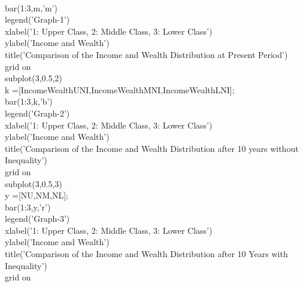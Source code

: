 \documentclass[12pt,a4paper]{article}
\begin{document}
\\bar(1:3,m,'m')
\\legend('Graph-1')
\\xlabel('1: Upper Class, 2: Middle Class, 3: Lower Class')
\\ylabel('Income and Wealth')
\\title('Comparison of the Income and Wealth Distribution at Present Period')
\\grid on
\\subplot(3,0.5,2)
\\k =[IncomeWealthUNI,IncomeWealthMNI,IncomeWealthLNI];
\\bar(1:3,k,'b')
\\legend('Graph-2')
\\xlabel('1: Upper Class, 2: Middle Class, 3: Lower Class')
\\ylabel('Income and Wealth')
\\title('Comparison of the Income and Wealth Distribution after 10 years without Inequality')
\\grid on
\\subplot(3,0.5,3)
\\y =[NU,NM,NL];
\\bar(1:3,y,'r')
\\legend('Graph-3')
\\xlabel('1: Upper Class, 2: Middle Class, 3: Lower Class')
\\ylabel('Income and Wealth')
\\title('Comparison of the Income and Wealth Distribution after 10 Years with Inequality')
\\grid on
\end{document}
